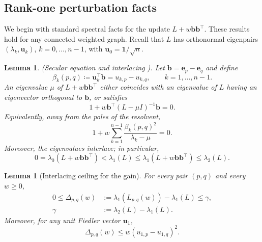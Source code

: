 \documentclass[11pt]{article}
\numberwithin{equation}{section}
\newtheorem{lemma}[theorem]{Lemma}
\theoremstyle{definition}
\theoremstyle{remark}
\begin{document}
\subsection{Rank-one perturbation facts}

We begin with standard spectral facts for the update
$L+w\boldsymbol{b}\boldsymbol{b}^{\top}$. These results hold for any
connected weighted graph. Recall that $L$ has orthonormal eigenpairs
$(\lambda_k,\boldsymbol{u}_k)$, $k=0,\dots,n-1$, with
$\boldsymbol{u}_0=\boldsymbol{1}/\sqrt{n}$.

\begin{lemma}
	\label{lem:lambda_update}
	\emph{(Secular equation and interlacing \cite{Cve-Doob-Sachs,HornJohnson2012,So1999}).}
	Let $\boldsymbol{b}=\boldsymbol{e}_p-\boldsymbol{e}_q$ and define
	\begin{equation*}
		\beta_k(p,q)\coloneqq \boldsymbol{u}_k^\top\boldsymbol{b}
		= u_{k,p}-u_{k,q},
		\qquad k=1,\dots,n-1.
	\end{equation*}
	An eigenvalue $\mu$ of $L+w\boldsymbol{b}\boldsymbol{b}^\top$ either
	coincides with an eigenvalue of $L$ having an eigenvector orthogonal to
	$\boldsymbol{b}$, or satisfies
	\begin{equation}\label{eq:secular_resolvent}
		1+w\boldsymbol{b}^\top(L-\mu I)^{-1}\boldsymbol{b}=0.
	\end{equation}
	Equivalently, away from the poles of the resolvent,
	\begin{equation}\label{eq:secular_spectral}
		1+w\sum_{k=1}^{n-1}\frac{\beta_k(p,q)^2}{\lambda_k-\mu}=0.
	\end{equation}
	Moreover, the eigenvalues interlace; in particular,
	\begin{equation}\label{eq:interlacing_inequalities}
		0=\lambda_0(L+w\boldsymbol{b}\boldsymbol{b}^\top)<\lambda_1(L)
		\le \lambda_1(L+w\boldsymbol{b}\boldsymbol{b}^\top)
		\le \lambda_2(L).
	\end{equation}
\end{lemma}

\begin{lemma}[Interlacing ceiling for the gain]\label{lem:gain_ceiling}
	For every pair $(p,q)$ and every $w\ge 0$,
	\begin{equation*}
		\begin{split}
			0\le \Delta_{p,q}(w)&:=
			\lambda_1(L_{p,q}(w))-\lambda_1(L)\le \gamma,\\
			\gamma&:=\lambda_2(L)-\lambda_1(L).
		\end{split}
	\end{equation*}
	Moreover, for any unit Fiedler vector $\boldsymbol{u}_1$,
	\[
	\Delta_{p,q}(w)\le w(u_{1,p}-u_{1,q})^2.
	\]
\end{lemma}
\end{document}
